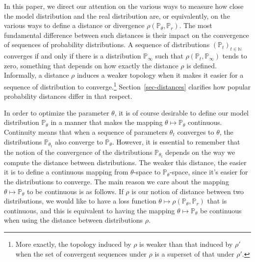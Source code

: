 \documentclass{article} %
\newcommand\NN{\mathbb{N}}
\newcommand\PP{\mathbb{P}}
\theoremstyle{definition}
\theoremstyle{definition}
\begin{document}
In this paper, we direct our attention on the various ways to measure
how close the model distribution and the real distribution are, or
equivalently, on the various ways to define a distance or divergence
$\rho(\PP_\theta,\PP_r)$. The most fundamental difference between such
distances is their impact on the convergence of sequences of
probability distributions. A sequence of distributions
$(\PP_t)_{t\in\NN}$ converges if and only if there is a distribution
$\PP_\infty$ such that $\rho(\PP_t,\PP_\infty)$ tends to zero,
something that depends on how exactly the distance $\rho$ is defined.
Informally, a distance $\rho$ induces a weaker topology when it makes
it easier for a sequence of distribution to converge.\footnote{More
  exactly, the topology induced by $\rho$ is weaker than that induced
  by $\rho'$ when the set of convergent sequences under $\rho$ is a
  superset of that under $\rho'$.}  Section~\ref{sec-distances}
clarifies how popular probability distances differ in that respect.

In order to optimize the parameter $\theta$, it is of course desirable
to define our model distribution $\PP_\theta$ in a manner that makes
the mapping $\theta\mapsto\PP_\theta$ continuous.
Continuity means that when a sequence of parameters $\theta_t$ converges
to $\theta$, the distributions $\PP_{\theta_t}$ also converge
to $\PP_\theta$. However, it is essential to remember that the
notion of the convergence of the distributions $\PP_{\theta_t}$ depends
on the way we compute the distance between distributions.
The weaker this distance, the easier
it is to define a continuous mapping from $\theta$-space to
$\PP_{\theta}$-space, since it's easier for the
distributions to converge.
The main reason we care about the mapping $\theta \mapsto \PP_\theta$
to be continuous is as follows. If $\rho$ is our notion of
distance between two distributions, we would like to have a loss
function $\theta \mapsto \rho(\PP_\theta, \PP_r)$ that is continuous,
and this is equivalent to having the mapping $\theta \mapsto \PP_\theta$
be continuous when using the distance between distributions $\rho$.
\end{document}
